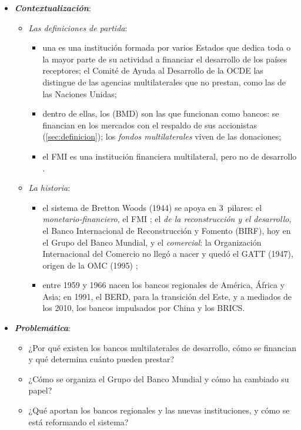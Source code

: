 \documentclass[11pt]{article}
\begin{document}
\begin{itemize}
\item \textbf{\emph{Contextualización}}:
  \begin{itemize}
  \item \emph{Las definiciones de partida}:
    \begin{itemize}
    \item una  es una institución formada por varios Estados que dedica toda o la mayor parte de su actividad a financiar el desarrollo de los países receptores; el Comité de Ayuda al Desarrollo de la OCDE las distingue de las agencias multilaterales que no prestan, como las de las Naciones Unidas\nocite{OCDE2026Multilaterales};
    \item dentro de ellas, los  (BMD) son las que funcionan como bancos: se financian en los mercados con el respaldo de sus accionistas (\ref{sec:definicion}); los \emph{fondos multilaterales} viven de las donaciones;
    \item el FMI es una institución financiera multilateral, pero no de desarrollo .
    \end{itemize}
  \item \emph{La historia}:
    \begin{itemize}
    \item el sistema de Bretton Woods (1944) se apoya en 3~pilares: el \emph{monetario-financiero}, el FMI ; el \emph{de la reconstrucción y el desarrollo}, el Banco Internacional de Reconstrucción y Fomento (BIRF), hoy en el Grupo del Banco Mundial, y el \emph{comercial}: la Organización Internacional del Comercio no llegó a nacer y quedó el GATT (1947), origen de la OMC (1995)  ;
    \item entre 1959 y 1966 nacen los bancos regionales de América, África y Asia; en 1991, el BERD, para la transición del Este, y a mediados de los 2010, los bancos impulsados por China y los BRICS.
    \end{itemize}
  \end{itemize}

\item \textbf{\emph{Problemática}}:
  \begin{itemize}
  \item ¿Por qué existen los bancos multilaterales de desarrollo, cómo se financian y qué determina cuánto pueden prestar?
  \item ¿Cómo se organiza el Grupo del Banco Mundial y cómo ha cambiado su papel?
  \item ¿Qué aportan los bancos regionales y las nuevas instituciones, y cómo se está reformando el sistema?
  \end{itemize}


\end{itemize}
\end{document}
